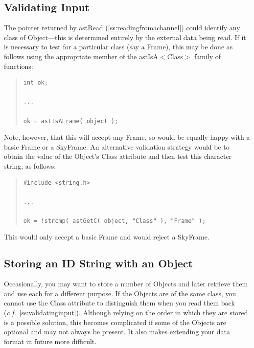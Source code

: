 \documentclass[twoside,11pt]{article}
\newcommand{\htmlref}[2]{#1}
\newcommand{\secref}[1]{\S\ref{#1}}
\renewcommand{\secref}[1]{\ref{#1}}
\begin{document}
\subsection{\label{ss:validatinginput}Validating Input}

The pointer returned by \htmlref{astRead}{astRead} (\secref{ss:readingfromachannel}) could
identify any class of \htmlref{Object}{Object}---this is determined entirely by the
external data being read. If it is necessary to test for a particular
class (say a \htmlref{Frame}{Frame}), this may be done as follows using the appropriate
member of the \htmlref{astIsA$<$Class$>$}{astIsAClass} family of functions:

\begin{quote}
\small
\begin{verbatim}
int ok;

...

ok = astIsAFrame( object );
\end{verbatim}
\normalsize
\end{quote}

Note, however, that this will accept any Frame, so would be equally
happy with a basic Frame or a \htmlref{SkyFrame}{SkyFrame}.  An alternative validation
strategy would be to obtain the value of the Object's \htmlref{Class}{Class} attribute
and then test this character string, as follows:

\begin{quote}
\small
\begin{verbatim}
#include <string.h>

...

ok = !strcmp( astGetC( object, "Class" ), "Frame" );
\end{verbatim}
\normalsize
\end{quote}

This would only accept a basic Frame and would reject a SkyFrame.

\subsection{Storing an ID String with an Object}

Occasionally, you may want to store a number of Objects and later
retrieve them and use each for a different purpose. If the Objects are
of the same class, you cannot use the \htmlref{Class}{Class} attribute to distinguish
them when you read them back
({\em{c.f.}}~\secref{ss:validatinginput}). Although relying on the
order in which they are stored is a possible solution, this becomes
complicated if some of the Objects are optional and may not always be
present. It also makes extending your data format in future more
difficult.
\end{document}
